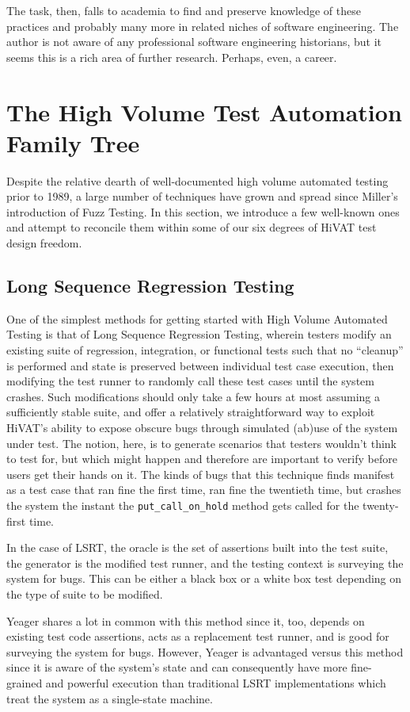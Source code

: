 The task, then, falls to academia to find and preserve knowledge of these practices and probably many more in related niches of software engineering. The author is not aware of any professional software engineering historians, but it seems this is a rich area of further research. Perhaps, even, a career.

\section{The High Volume Test Automation Family Tree}
Despite the relative dearth of well-documented high volume automated testing prior to 1989, a large number of techniques have grown and spread since Miller's introduction of Fuzz Testing. In this section, we introduce a few well-known ones and attempt to reconcile them within some of our six degrees of HiVAT test design freedom.

\subsection{Long Sequence Regression Testing}
One of the simplest methods for getting started with High Volume Automated Testing is that of Long Sequence Regression Testing, wherein testers modify an existing suite of regression, integration, or functional tests such that no ``cleanup'' is performed and state is preserved between individual test case execution, then modifying the test runner to randomly call these test cases until the system crashes. Such modifications should only take a few hours at most assuming a sufficiently stable suite, and offer a relatively straightforward way to exploit HiVAT's ability to expose obscure bugs through simulated (ab)use of the system under test. The notion, here, is to generate scenarios that testers wouldn't think to test for, but which might happen and therefore are important to verify before users get their hands on it. The kinds of bugs that this technique finds manifest as a test case that ran fine the first time, ran fine the twentieth time, but crashes the system the instant the \texttt{put\_call\_on\_hold} method gets called for the twenty-first time.

In the case of LSRT, the oracle is the set of assertions built into the test suite, the generator is the modified test runner, and the testing context is surveying the system for bugs. This can be either a black box or a white box test depending on the type of suite to be modified.

Yeager shares a lot in common with this method since it, too, depends on existing test code assertions, acts as a replacement test runner, and is good for surveying the system for bugs. However, Yeager is advantaged versus this method since it is aware of the system's state and can consequently have more fine-grained and powerful execution than traditional LSRT implementations which treat the system as a single-state machine.


